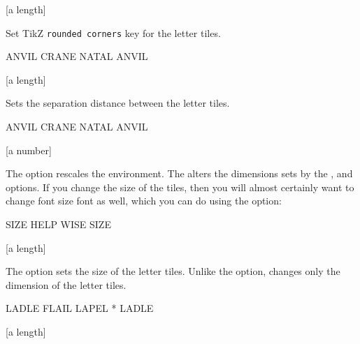 \documentclass[svgnames]{report}
\begin{document}
  [a length]

  Set TikZ \texttt{rounded corners} key for the  letter tiles.

  \begin{example}
    \begin{wordle}[rounded=2mm]{ANVIL}
      CRANE
      NATAL
      ANVIL
    \end{wordle}
  \end{example}

  [a length]

  Sets the separation distance between the  letter
  tiles.

  \begin{example}
    \begin{wordle}[separation=2mm, borders=black]{ANVIL}
      CRANE
      NATAL
      ANVIL
    \end{wordle}
  \end{example}

  [a number]

  The  option rescales the  environment.
  The  alters the dimensions sets by the ,
    and   options.  If
  you change the size  of the tiles, then you will almost certainly want
  to change font size font as well, which you can do using the
   option:

  \begin{example}
    \begin{wordle}[scale=1.5, font=\huge\bfseries]{SIZE}
       HELP
       WISE
       SIZE
    \end{wordle}
  \end{example}

  [a length]

  The  option sets the size of the 
  letter tiles. Unlike the  option,  changes only the dimension of
  the letter tiles.

  \begin{example}
    \begin{wordle}[size=10mm, font=\huge\bfseries]{LADLE}
       FLAIL LAPEL * LADLE
    \end{wordle}
  \end{example}

  [a length]
\end{document}
